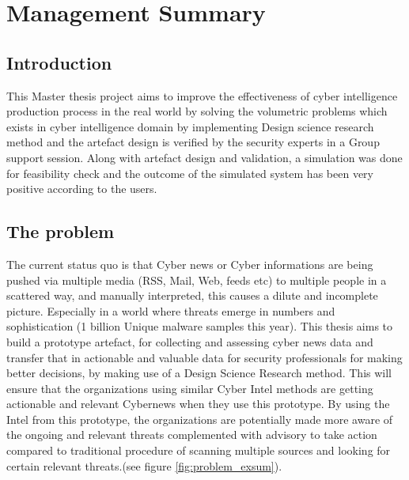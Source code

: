 
\chapter{Management Summary} %

\label{Management Summary} %





\section{Introduction}
This Master thesis project aims to improve the effectiveness of cyber intelligence production process in the real world by solving the volumetric problems which exists in cyber intelligence domain by implementing Design science research method and the artefact design is verified by the security experts in a Group support session. 
Along with artefact design and validation, a simulation was done for feasibility check and the outcome of the simulated system has been very positive according to the users. 


\section{The problem }
The current status quo is that Cyber news or Cyber informations are being pushed via multiple media (RSS, Mail, Web, feeds etc) to multiple people in a scattered way, and manually interpreted, this causes a dilute and incomplete picture. 
Especially in a world where threats emerge in numbers and sophistication (1 billion Unique malware samples this year). 
This thesis aims to build a prototype artefact, for collecting and assessing cyber news data and transfer that in actionable and valuable data for security professionals for making better decisions, by making use of a Design Science Research method.
This will ensure that the organizations using similar Cyber Intel methods are getting actionable and relevant Cybernews when they use this prototype. 
By using the Intel from this prototype, the organizations are potentially made more aware of the ongoing and relevant threats complemented with advisory to take action compared to traditional procedure of scanning multiple sources and looking for certain relevant threats.(see figure \ref{fig:problem_exsum}).


